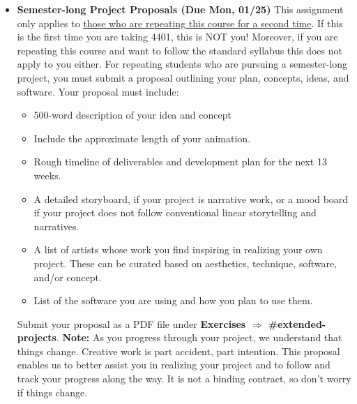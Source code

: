 \def\dMon{Mon, 01/25}
\def\dTues{Tues, 01/26}
\def\dWed{Wed, 01/27}
\def\dThur{Thur, 01/28}
\def\dFri{Fri, 01/29}
\def\dSat{Sat, 01/30}
\def\dSun{Sun, 01/31}
\placeDate





% 
\begin{itemize}[noitemsep,topsep=0pt,leftmargin=*]
    \item \textbf{Semester-long Project Proposals (Due \dMon)} This assignment only applies to \ul{those who are repeating this course for a second time}. If this is the first time you are taking 4401, this is NOT you! Moreover, if you are repeating this course and want to follow the standard syllabus this does not apply to you either. For repeating students who are pursuing a semester-long project, you must submit a proposal outlining your plan, concepts, ideas, and software. Your proposal must include:
          \begin{itemize}
              \item 500-word description of your idea and concept
              \item Include the approximate length of your animation.
              \item Rough timeline of deliverables and development plan for the next 13 weeks.
              \item A detailed storyboard, if your project is narrative work, or a mood board if your project does not follow conventional linear storytelling and narratives.
              \item A list of artists whose work you find inspiring in realizing your own project. These can be curated based on aesthetics, technique, software, and/or concept.
              \item List of the software you are using and how you plan to use them.
          \end{itemize}
    Submit your proposal as a PDF file under \textbf{Exercises $\Rightarrow$ \#extended-projects}. \newline
    \small{\textbf{Note:} As you progress through your project, we understand that things change. Creative work is part accident, part intention. This proposal enables us to better assist you in realizing your project and to follow and track your progress along the way. It is not a binding contract, so don't worry if things change.}
\end{itemize}
\vspace{1em}
